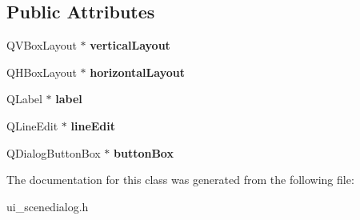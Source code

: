 \subsection*{Public Attributes}
\begin{DoxyCompactItemize}
\item 
\hypertarget{classUi__SceneDialog_add94ac9bf68ea7783f29e7138a0d29ac}{Q\-V\-Box\-Layout $\ast$ {\bfseries vertical\-Layout}}\label{classUi__SceneDialog_add94ac9bf68ea7783f29e7138a0d29ac}

\item 
\hypertarget{classUi__SceneDialog_ac1c40b201004a216ff06a8ec7f85d441}{Q\-H\-Box\-Layout $\ast$ {\bfseries horizontal\-Layout}}\label{classUi__SceneDialog_ac1c40b201004a216ff06a8ec7f85d441}

\item 
\hypertarget{classUi__SceneDialog_a72db3f918483b57e410ec73936fba35f}{Q\-Label $\ast$ {\bfseries label}}\label{classUi__SceneDialog_a72db3f918483b57e410ec73936fba35f}

\item 
\hypertarget{classUi__SceneDialog_af510f91fc9536b2760f8414d4bc2ea8f}{Q\-Line\-Edit $\ast$ {\bfseries line\-Edit}}\label{classUi__SceneDialog_af510f91fc9536b2760f8414d4bc2ea8f}

\item 
\hypertarget{classUi__SceneDialog_a89117059c080378237d8de9029197438}{Q\-Dialog\-Button\-Box $\ast$ {\bfseries button\-Box}}\label{classUi__SceneDialog_a89117059c080378237d8de9029197438}

\end{DoxyCompactItemize}


The documentation for this class was generated from the following file\-:\begin{DoxyCompactItemize}
\item 
ui\-\_\-scenedialog.\-h\end{DoxyCompactItemize}
